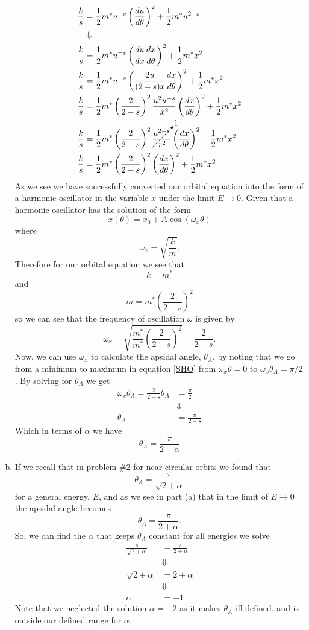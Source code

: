 \documentclass[11pt]{article}
\numberwithin{equation}{section}
\begin{document}
\begin{enumerate}[(a)]
\begin{align*}
\frac{k}{s} &= \frac{1}{2}m^*u^{-s}\left(\frac{du}{d\theta}\right)^2 + \frac{1}{2}m^*u^{2-s}\\
&\Downarrow\\
\frac{k}{s} &= \frac{1}{2}m^*u^{-s}\left(\frac{du}{dx}\frac{dx}{d\theta}\right)^2 + \frac{1}{2}m^*x^2\\
\frac{k}{s} &= \frac{1}{2}m^*u^{-s}\left(\frac{2u}{(2-s)x}\frac{dx}{d\theta}\right)^2 + \frac{1}{2}m^*x^2\\
\frac{k}{s} &= \frac{1}{2}m^*\left(\frac{2}{2-s}\right)^2\frac{u^2u^{-s}}{x^2}\left(\frac{dx}{d\theta}\right)^2 + \frac{1}{2}m^*x^2\\
\frac{k}{s} &= \frac{1}{2}m^*\left(\frac{2}{2-s}\right)^2\cancelto{1}{\frac{u^{2-s}}{x^2}}\left(\frac{dx}{d\theta}\right)^2 + \frac{1}{2}m^*x^2\\
\frac{k}{s} &= \frac{1}{2}m^*\left(\frac{2}{2-s}\right)^2\left(\frac{dx}{d\theta}\right)^2 + \frac{1}{2}m^*x^2
\end{align*}
As we see we have successfully converted our orbital equation into the form of a harmonic 
oscillator in the variable $x$ under the limit $E\rightarrow0$. Given that a harmonic 
oscillator has the solution of the form
\begin{equation}
x(\theta) = x_0 + A\cos(\omega_x \theta)
\label{SHO}
\end{equation}
where
$$\omega_x = \sqrt{\frac{k}{m}}.$$
Therefore for our orbital equation we see that 
$$k = m^*$$
and
$$m = m^*\left(\frac{2}{2-s}\right)^2$$
so we can see that the frequency of oscillation $\omega$ is given by
$$\omega_x = \sqrt{\frac{m^*}{m^*}\left(\frac{2}{2-s}\right)^2} = \frac{2}{2-s}.$$
Now, we can use $\omega_x$ to calculate the apsidal angle, $\theta_A$, by noting that we go
from a minimum to maximum in equation \ref{SHO} from $\omega_x\theta=0$ to 
$\omega_x\theta_A=\pi/2$. By solving for $\theta_A$ we get
\begin{align*}
\omega_x\theta_A = \frac{2}{2-s}\theta_A &= \frac{\pi}{2}\\
&\Downarrow\\
\theta_A &= \frac{\pi}{2-s}
\end{align*}
Which in terms of $\alpha$ we have
$$\theta_A = \frac{\pi}{2+\alpha}$$

\item If we recall that in problem \#2 for near circular orbits we found that 
$$\theta_A = \frac{\pi}{\sqrt{2+\alpha}}$$
for a general energy, $E$, and as we see in part (a) that in the limit of $E\rightarrow0$ 
the apsidal angle becomes
$$\theta_A = \frac{\pi}{2+\alpha}.$$
So, we can find the $\alpha$ that keeps $\theta_A$ constant for all energies we solve
\begin{align*}
\frac{\pi}{\sqrt{2+\alpha}} &= \frac{\pi}{2+\alpha}\\
&\Downarrow\\
\sqrt{2+\alpha} &= 2+\alpha\\
&\Downarrow\\
\alpha &= -1
\end{align*}
Note that we neglected the solution $\alpha=-2$ as it makes $\theta_A$ ill defined, and is
outside our defined range for $\alpha$.


\end{enumerate}
\end{document}
